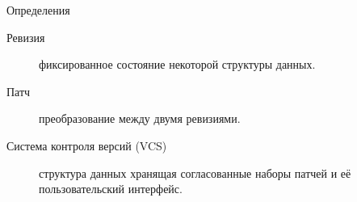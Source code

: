\begin{frame}{Определения}
\begin{description}
\item[Ревизия] фиксированное состояние некоторой структуры данных.
\item[Патч] преобразование между двумя ревизиями.
\item[Система контроля версий (VCS)] структура данных хранящая согласованные наборы патчей и её пользовательский интерфейс.
\end{description}
\end{frame}
